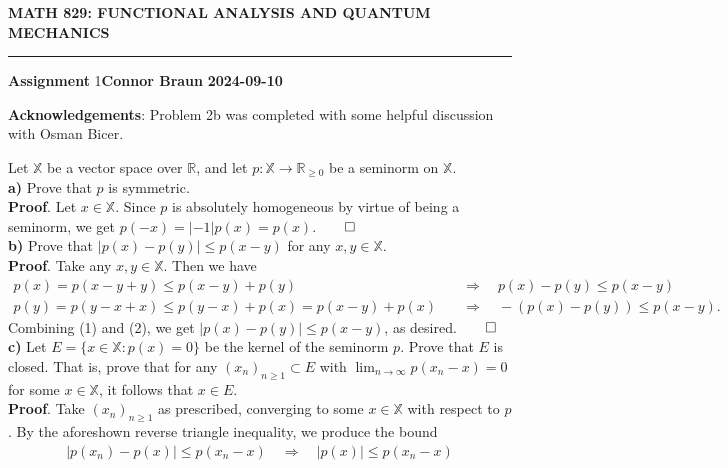 \documentclass[10pt]{article}
\newcommand{\mbb}[1]{\mathbb{#1}}
\newcommand{\1}[1]{\mathbbm{1}_{#1}}
\begin{document}
    \begin{center}
        {\bf\large{MATH 829: FUNCTIONAL ANALYSIS AND QUANTUM MECHANICS}}
        \smallskip
        \hrule
        \smallskip
        {\bf Assignment} 1\hfill {\bf Connor Braun} \hfill {\bf 2024-09-10}
    \end{center}
    \vspace{5pt}
    \begin{center}
        \begin{minipage}{\dimexpr\paperwidth-10cm}
            {\bf Acknowledgements}: Problem 2b was completed with some helpful
            discussion with Osman Bicer. 
        \end{minipage}
    \end{center}
     Let $\mbb{X}$ be a vector space over $\mbb{R}$, and
    let $p:\mbb{X}\rightarrow\mbb{R}_{\geq 0}$ be a seminorm on
    $\mbb{X}$.\\[5pt]
    {\bf a)} Prove that $p$ is symmetric.\\[5pt]
    {\bf Proof}. Let $x\in\mbb{X}$. Since $p$ is absolutely homogeneous by
    virtue of being a seminorm, we get
    $p(-x)=|-1|p(x)=p(x)$.\hfill{$\qed$}\\[5pt]
    {\bf b)} Prove that $|p(x)-p(y)|\leq p(x-y)$ for any $x,y\in\mbb{X}$.\\[5pt]
    {\bf Proof}. Take any $x,y\in\mbb{X}$. Then we have 
    \begin{align*}
        p(x)=p(x-y+y)\leq p(x-y)+p(y)\quad&\Rightarrow\quad p(x)-p(y)\leq p(x-y)\tag{1}\\
        p(y)=p(y-x+x)\leq p(y-x)+p(x)=p(x-y)+p(x)\quad&\Rightarrow\quad -(p(x)-p(y))\leq p(x-y).\tag{2}
    \end{align*}
    Combining (1) and (2), we get $|p(x)-p(y)|\leq p(x-y)$, as
    desired.\hfill{$\qed$}\\[5pt]
    {\bf c)} Let $E=\{x\in\mbb{X}:p(x)=0\}$ be the kernel of the seminorm $p$.
    Prove that $E$ is closed. That is, prove that for any $(x_n)_{n\geq
    1}\subset E$ with $\lim_{n\rightarrow\infty}p(x_n-x)=0$ for some
    $x\in\mbb{X}$, it follows that $x\in E$.\\[5pt]
    {\bf Proof}. Take $(x_n)_{n\geq 1}$ as prescribed, converging to some
    $x\in\mbb{X}$ with respect to $p$. By the aforeshown reverse triangle
    inequality, we produce the bound
    \begin{align*}
        |p(x_n)-p(x)|\leq p(x_n-x)\quad\Rightarrow\quad |p(x)|\leq p(x_n-x)
    \end{align*}
\end{document}
